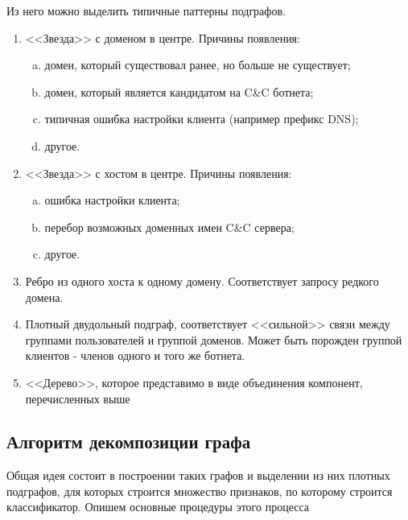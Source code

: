 \documentclass[a4paper,14pt]{extreport} %
\begin{document}
	
Из него можно выделить типичные паттерны подграфов.
\begin{enumerate}
	\item <<Звезда>> с доменом в центре. Причины появления:
	      \begin{enumerate}[a)]
	      	\item домен, который существовал ранее, но больше не существует;
	      	\item домен, который является кандидатом на C\&C ботнета;
	      	\item типичная ошибка настройки клиента (например префикс DNS);
	      	\item другое.
	      \end{enumerate}
	\item <<Звезда>> с хостом в центре. Причины появления:
	      \begin{enumerate}[a)]
	      	\item ошибка настройки клиента;
	      	\item перебор возможных доменных имен C\&C сервера;
	      	\item другое.
	      \end{enumerate}
	      	      	      	
	\item Ребро из одного хоста к одному домену. Соответствует запросу редкого домена.
	      	      	      	
	\item Плотный двудольный подграф, соответствует <<сильной>> связи между группами пользователей и группой доменов. Может быть порожден группой клиентов - членов одного и того же ботнета.
	      	      	      	
	\item <<Дерево>>, которое представимо в виде объединения компонент, перечисленных выше
\end{enumerate}
	
\subsection{Алгоритм декомпозиции графа}
Общая идея состоит в построении таких графов и выделении из них плотных подграфов, для которых строится множество признаков, по которому строится классификатор. Опишем основные процедуры этого процесса
	
\end{document}

